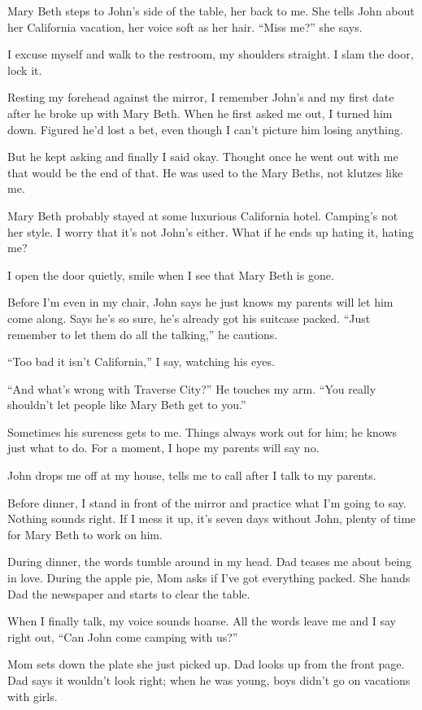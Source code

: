 \documentclass[
]{article}
\begin{document}
Mary Beth steps to John's side of the table, her back to me. She tells
John about her California vacation, her voice soft as her hair. ``Miss
me?'' she says.

I excuse myself and walk to the restroom, my shoulders straight. I slam
the door, lock it.

Resting my forehead against the mirror, I remember John's and my first
date after he broke up with Mary Beth. When he first asked me out, I
turned him down. Figured he'd lost a bet, even though I can't picture
him losing anything.

But he kept asking and finally I said okay. Thought once he went out
with me that would be the end of that. He was used to the Mary Beths,
not klutzes like me.

Mary Beth probably stayed at some luxurious California hotel. Camping's
not her style. I worry that it's not John's either. What if he ends up
hating it, hating me?

I open the door quietly, smile when I see that Mary Beth is gone.

Before I'm even in my chair, John says he just knows my parents will let
him come along. Says he's so sure, he's already got his suitcase packed.
``Just remember to let them do all the talking,'' he cautions.

``Too bad it isn't California,'' I say, watching his eyes.

``And what's wrong with Traverse City?'' He touches my arm. ``You really
shouldn't let people like Mary Beth get to you.''

Sometimes his sureness gets to me. Things always work out for him; he
knows just what to do. For a moment, I hope my parents will say no.

John drops me off at my house, tells me to call after I talk to my
parents.

Before dinner, I stand in front of the mirror and practice what I'm
going to say. Nothing sounds right. If I mess it up, it's seven days
without John, plenty of time for Mary Beth to work on him.

During dinner, the words tumble around in my head. Dad teases me about
being in love. Dur­ing the apple pie, Mom asks if I've got everything
packed. She hands Dad the newspaper and starts to clear the table.

When I finally talk, my voice sounds hoarse. All the words leave me and
I say right out, ``Can John come camping with us?''

Mom sets down the plate she just picked up. Dad looks up from the front
page. Dad says it wouldn't look right; when he was young, boys didn't go
on vacations with girls.
\end{document}

